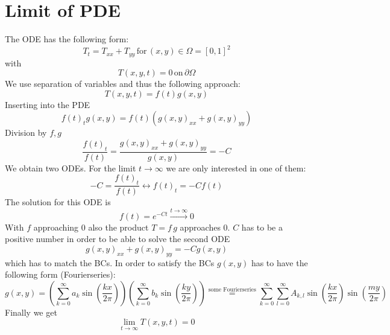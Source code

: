 \documentclass[12pt,a4paper]{scrreprt}
\author{Benjamin Rüth}
\begin{document}
\section*{Limit of PDE}
The ODE has the following form:
\begin{equation*}
T_t=T_{xx}+T_{yy}\, \text{for}\, \left(x,y\right)\in\Omega=\left[0,1\right]^2
\end{equation*}
with
\begin{equation*}
T\left(x,y,t\right)=0\, \text{on}\, \partial\Omega
\end{equation*}
We use separation of variables and thus the following approach:
\begin{equation*}
T\left(x,y,t\right)=f\left(t\right)g\left(x,y\right)
\end{equation*}
Inserting into the PDE
\begin{equation*}
f\left(t\right)_t g\left(x,y\right) =f\left(t\right) \left(g\left(x,y\right)_{xx}+g\left(x,y\right)_{yy}\right)
\end{equation*}
Division by $f,g$
\begin{equation*}
\frac{f\left(t\right)_t}{f\left(t\right)}=\frac{g\left(x,y\right)_{xx}+g\left(x,y\right)_{yy}}{ g\left(x,y\right)}=-C
\end{equation*}
We obtain two ODEs. For the limit $t\rightarrow \infty$ we are only interested in one of them:
\begin{equation*}
-C=\frac{f\left(t\right)_t}{f\left(t\right)} \leftrightarrow f\left(t\right)_t=-C f\left(t\right) 
\end{equation*}
The solution for this ODE is
\begin{equation*}
f\left(t\right)=e^{-C t}\overset{t\rightarrow\infty}{\rightarrow}0
\end{equation*}
With $f$ approaching $0$ also the product $T=f\,g$ approaches $0$. $C$ has to be a positive number in order to be able to solve the second ODE
\begin{equation*}
g\left(x,y\right)_{xx}+g\left(x,y\right)_{yy}=-C g\left(x,y\right)
\end{equation*}
which has to match the BCs. In order to satisfy the BCs $g\left(x,y\right)$ has to have the following form (Fourierseries):
\begin{equation*}
g \left( x,y \right)=
  \left( \sum\limits_{k=0}^\infty a_k \sin\left(\frac{kx}{2\pi}\right) \right) 
  \left( \sum\limits_{k=0}^\infty b_k \sin\left(\frac{ky}{2\pi}\right) \right)  
\overset{\text{some Fourierseries}}{=}
\sum\limits_{k=0}^\infty \sum\limits_{l=0}^\infty A_{k,l} \sin\left(\frac{kx}{2\pi}\right)\sin\left(\frac{my}{2\pi}\right)
\end{equation*}
Finally we get
\begin{equation*}
\lim_{t\rightarrow\infty}T\left(x,y,t\right)=0
\end{equation*}
\end{document}
